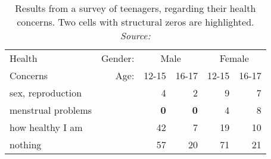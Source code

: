 %
\begin{table}[htb]
\centering
\caption{Results from a survey of teenagers, regarding their health concerns. Two cells with structural zeros are highlighted.  \emph{Source:}
  \citet[Table 8-3]{Fienberg:80} }
\label{tab:health}
\begin{tabular}{l|rrrrr}
  \hline
 Health     &  Gender:  &  \multicolumn{2}{c}{Male}  & \multicolumn{2}{c}{Female}  \\
 Concerns   &  Age:     &  12-15  &  16-17  &  12-15  &  16-17  \\
  \hline
  sex, reproduction  &          &       4 &       2 &       9 &       7 \\
  menstrual problems &          & \textbf{0} & \textbf{0} &       4 &       8 \\
  how healthy I am   &          &      42 &       7 &      19 &      10 \\
  nothing            &          &      57 &      20 &      71 &      21 \\
   \hline
\end{tabular}
\end{table}
%
